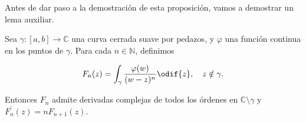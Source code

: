 \documentclass[../main.tex]{subfiles}
\begin{document}
Antes de dar paso a la demostración de esta proposición, vamos a demostrar un
lema auxiliar.

\begin{lemma}\label{lemma:lem-aux}
    Sea \(\gamma \colon [a, b] \to \mathbb{C}\) una curva cerrada suave por pedazos, y
    \(\varphi\) una función continua en los puntos de \(\gamma\). Para cada \(n\in
    \mathbb{N}\), definimos

    \begin{equation*}
        F_{n}(z) = \int_{\gamma}^{}\dfrac{\varphi(w)}{(w - z)^{n}}\odif{z},\quad z\notin
        \gamma.
    \end{equation*}

    Entonces \(F_{n}\) admite derivadas complejas de todos los órdenes en
    \(\mathbb{C}\setminus \gamma\) y \(F_{n}^{\prime}(z) = nF_{n + 1}(z)\).
\end{lemma}
\end{document}
